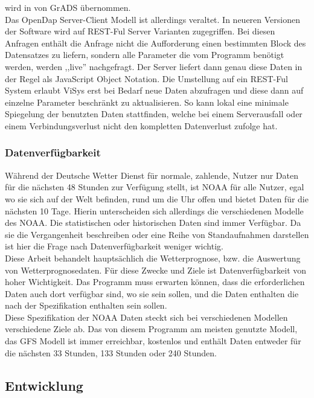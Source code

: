 wird in \vs von GrADS übernommen. \\
Das OpenDap Server-Client Modell ist allerdings veraltet. In neueren Versionen der Software
wird auf REST-Ful Server Varianten zugegriffen. Bei diesen Anfragen enthält die Anfrage
nicht die Aufforderung einen bestimmten Block des Datensatzes zu liefern, sondern alle
Parameter die vom Programm benötigt werden, werden ,,live'' nachgefragt. Der Server
liefert dann genau diese Daten in der Regel als JavaScript Object Notation.
Die Umstellung auf ein REST-Ful System erlaubt ViSys erst bei Bedarf neue Daten abzufragen
und diese dann auf einzelne Parameter beschränkt zu aktualisieren.
So kann lokal eine minimale Spiegelung der benutzten Daten stattfinden, welche bei einem
Serverausfall oder einem Verbindungsverlust nicht den kompletten Datenverlust zufolge hat.

\subsubsection{Datenverfügbarkeit} %
Während der Deutsche Wetter Dienst für normale, zahlende, Nutzer nur Daten
für die nächsten 48 Stunden zur Verfügung stellt, ist NOAA für alle Nutzer,
egal wo sie sich auf der Welt befinden, rund um die Uhr offen und bietet Daten
für die nächsten 10 Tage. Hierin unterscheiden sich allerdings die verschiedenen
Modelle des NOAA. Die statistischen oder historischen Daten sind immer Verfügbar.
Da sie die Vergangenheit beschreiben oder eine Reihe von Standaufnahmen darstellen
ist hier die Frage nach Datenverfügbarkeit weniger wichtig.\\
Diese Arbeit behandelt hauptsächlich die Wetterprognose, bzw. die Auswertung
von Wetterprognosedaten. Für diese Zwecke und Ziele ist Datenverfügbarkeit von
hoher Wichtigkeit. Das Programm muss erwarten können,
dass die erforderlichen Daten auch
dort verfügbar sind, wo sie sein sollen,
und die Daten enthalten die nach der
Spezifikation enthalten sein sollen.\\
Diese Spezifikation der NOAA Daten steckt sich bei verschiedenen Modellen
verschiedene Ziele ab.
Das von diesem Programm am meisten genutzte Modell,
das GFS Modell ist immer erreichbar,
kostenlos und enthält Daten entweder für die nächsten 33 Stunden,
133 Stunden oder 240 Stunden.

\subsection{Entwicklung} %

